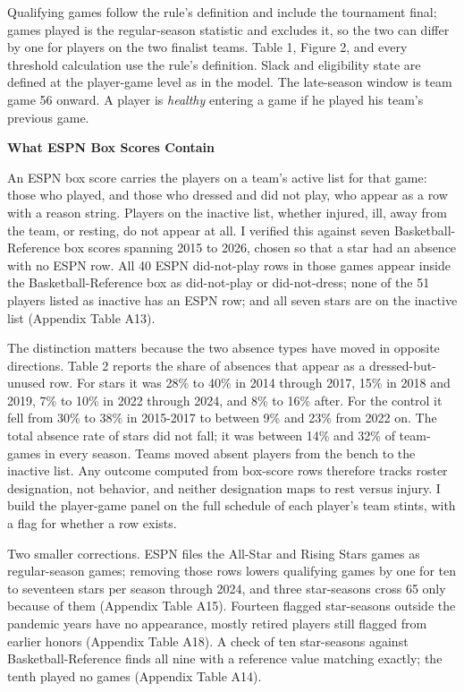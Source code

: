 \documentclass[12pt]{article}
\newcommand{\ltwo}[1]{\par\medskip\noindent\textbf{#1}\par\nopagebreak}
\begin{document}
Qualifying games follow the rule's definition and include the tournament final; games played is the regular-season statistic and excludes it, so the two can differ by one for players on the two finalist teams. Table 1, Figure 2, and every threshold calculation use the rule's definition. Slack and eligibility state are defined at the player-game level as in the model. The late-season window is team game 56 onward. A player is \emph{healthy} entering a game if he played his team's previous game.


\ltwo{What ESPN Box Scores Contain}


An ESPN box score carries the players on a team's active list for that game: those who played, and those who dressed and did not play, who appear as a row with a reason string. Players on the inactive list, whether injured, ill, away from the team, or resting, do not appear at all. I verified this against seven Basketball-Reference box scores spanning 2015 to 2026, chosen so that a star had an absence with no ESPN row. All 40 ESPN did-not-play rows in those games appear inside the Basketball-Reference box as did-not-play or did-not-dress; none of the 51 players listed as inactive has an ESPN row; and all seven stars are on the inactive list (Appendix Table A13).

The distinction matters because the two absence types have moved in opposite directions. Table 2 reports the share of absences that appear as a dressed-but-unused row. For stars it was 28\% to 40\% in 2014 through 2017, 15\% in 2018 and 2019, 7\% to 10\% in 2022 through 2024, and 8\% to 16\% after. For the control it fell from 30\% to 38\% in 2015-2017 to between 9\% and 23\% from 2022 on. The total absence rate of stars did not fall; it was between 14\% and 32\% of team-games in every season. Teams moved absent players from the bench to the inactive list. Any outcome computed from box-score rows therefore tracks roster designation, not behavior, and neither designation maps to rest versus injury. I build the player-game panel on the full schedule of each player's team stints, with a flag for whether a row exists.


Two smaller corrections. ESPN files the All-Star and Rising Stars games as regular-season games; removing those rows lowers qualifying games by one for ten to seventeen stars per season through 2024, and three star-seasons cross 65 only because of them (Appendix Table A15). Fourteen flagged star-seasons outside the pandemic years have no appearance, mostly retired players still flagged from earlier honors (Appendix Table A18). A check of ten star-seasons against Basketball-Reference finds all nine with a reference value matching exactly; the tenth played no games (Appendix Table A14).
\end{document}
